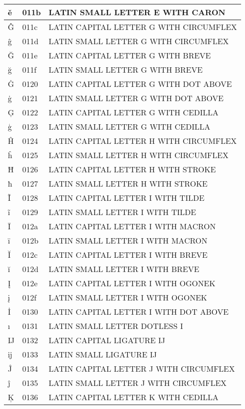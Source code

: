 \documentclass[12pt,letterpaper,openany]{book}
\begin{document}
\begin{center}
\begin{supertabular}{|m{0.25in}|m{0.5in}|m{4in}|}
ě & 011b & LATIN SMALL LETTER E WITH CARON\\\hline
Ĝ & 011c & LATIN CAPITAL LETTER G WITH CIRCUMFLEX\\\hline
ĝ & 011d & LATIN SMALL LETTER G WITH CIRCUMFLEX\\\hline
Ğ & 011e & LATIN CAPITAL LETTER G WITH BREVE\\\hline
ğ & 011f & LATIN SMALL LETTER G WITH BREVE\\\hline
Ġ & 0120 & LATIN CAPITAL LETTER G WITH DOT ABOVE\\\hline
ġ & 0121 & LATIN SMALL LETTER G WITH DOT ABOVE\\\hline
Ģ & 0122 & LATIN CAPITAL LETTER G WITH CEDILLA\\\hline
ģ & 0123 & LATIN SMALL LETTER G WITH CEDILLA\\\hline
Ĥ & 0124 & LATIN CAPITAL LETTER H WITH CIRCUMFLEX\\\hline
ĥ & 0125 & LATIN SMALL LETTER H WITH CIRCUMFLEX\\\hline
Ħ & 0126 & LATIN CAPITAL LETTER H WITH STROKE\\\hline
ħ & 0127 & LATIN SMALL LETTER H WITH STROKE\\\hline
Ĩ & 0128 & LATIN CAPITAL LETTER I WITH TILDE\\\hline
ĩ & 0129 & LATIN SMALL LETTER I WITH TILDE\\\hline
Ī & 012a & LATIN CAPITAL LETTER I WITH MACRON\\\hline
ī & 012b & LATIN SMALL LETTER I WITH MACRON\\\hline
Ĭ & 012c & LATIN CAPITAL LETTER I WITH BREVE\\\hline
ĭ & 012d & LATIN SMALL LETTER I WITH BREVE\\\hline
Į & 012e & LATIN CAPITAL LETTER I WITH OGONEK\\\hline
į & 012f & LATIN SMALL LETTER I WITH OGONEK\\\hline
İ & 0130 & LATIN CAPITAL LETTER I WITH DOT ABOVE\\\hline
ı & 0131 & LATIN SMALL LETTER DOTLESS I\\\hline
Ĳ & 0132 & LATIN CAPITAL LIGATURE IJ\\\hline
ĳ & 0133 & LATIN SMALL LIGATURE IJ\\\hline
Ĵ & 0134 & LATIN CAPITAL LETTER J WITH CIRCUMFLEX\\\hline
ĵ & 0135 & LATIN SMALL LETTER J WITH CIRCUMFLEX\\\hline
Ķ & 0136 & LATIN CAPITAL LETTER K WITH CEDILLA\\\hline

\end{supertabular}
\end{center}
\end{document}
